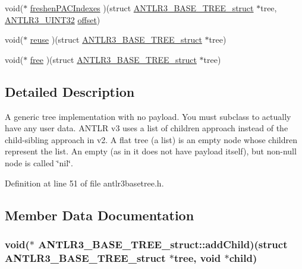 \begin{DoxyCompactItemize}
\item 
void($\ast$ \hyperlink{struct_a_n_t_l_r3___b_a_s_e___t_r_e_e__struct_ab705dcb2ebc64aac65cfc2c5e740a8d6}{freshen\-P\-A\-C\-Indexes} )(struct \hyperlink{struct_a_n_t_l_r3___b_a_s_e___t_r_e_e__struct}{A\-N\-T\-L\-R3\-\_\-\-B\-A\-S\-E\-\_\-\-T\-R\-E\-E\-\_\-struct} $\ast$tree, \hyperlink{antlr3defs_8h_ac41f744abd0fd25144b9eb9d11b1dfd1}{A\-N\-T\-L\-R3\-\_\-\-U\-I\-N\-T32} \hyperlink{qmb_8m_a4dd6f73f98b7876577fd0d041b94d968}{offset})
\item 
void($\ast$ \hyperlink{struct_a_n_t_l_r3___b_a_s_e___t_r_e_e__struct_ad0d5c3a3cf21e9a5b2a38cccef396a74}{reuse} )(struct \hyperlink{struct_a_n_t_l_r3___b_a_s_e___t_r_e_e__struct}{A\-N\-T\-L\-R3\-\_\-\-B\-A\-S\-E\-\_\-\-T\-R\-E\-E\-\_\-struct} $\ast$tree)
\item 
void($\ast$ \hyperlink{struct_a_n_t_l_r3___b_a_s_e___t_r_e_e__struct_a6106dc049d14a08ea8c73e34f45d279f}{free} )(struct \hyperlink{struct_a_n_t_l_r3___b_a_s_e___t_r_e_e__struct}{A\-N\-T\-L\-R3\-\_\-\-B\-A\-S\-E\-\_\-\-T\-R\-E\-E\-\_\-struct} $\ast$tree)
\end{DoxyCompactItemize}


\subsection{Detailed Description}
A generic tree implementation with no payload. You must subclass to actually have any user data. A\-N\-T\-L\-R v3 uses a list of children approach instead of the child-\/sibling approach in v2. A flat tree (a list) is an empty node whose children represent the list. An empty (as in it does not have payload itself), but non-\/null node is called \char`\"{}nil\char`\"{}. 

Definition at line 51 of file antlr3basetree.\-h.



\subsection{Member Data Documentation}
\hypertarget{struct_a_n_t_l_r3___b_a_s_e___t_r_e_e__struct_ae1dac66500c29730b5514b874ebf3ddf}{
\subsubsection[{add\-Child}]{\setlength{\rightskip}{0pt plus 5cm}void($\ast$ A\-N\-T\-L\-R3\-\_\-\-B\-A\-S\-E\-\_\-\-T\-R\-E\-E\-\_\-struct\-::add\-Child)(struct {\bf A\-N\-T\-L\-R3\-\_\-\-B\-A\-S\-E\-\_\-\-T\-R\-E\-E\-\_\-struct} $\ast$tree, void $\ast$child)}}\label{struct_a_n_t_l_r3___b_a_s_e___t_r_e_e__struct_ae1dac66500c29730b5514b874ebf3ddf}



